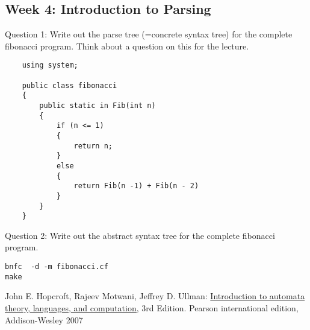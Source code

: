 \documentclass{article}
\theoremstyle{theorem}
\theoremstyle{definition}
\theoremstyle{remark}
\begin{document}
\subsection{Week 4: Introduction to Parsing}
Question 1: Write out the parse tree (=concrete syntax tree) for the complete fibonacci program. Think about a question on this for the lecture.
\begin{lstlisting}
	using system;
	
	public class fibonacci
	{
		public static in Fib(int n)
		{
			if (n <= 1)
			{
				return n;
			}
			else
			{
				return Fib(n -1) + Fib(n - 2)
			}
		}
	}
\end{lstlisting}
Question 2: Write out the abstract syntax tree for the complete fibonacci program. 
\begin{lstlisting}
bnfc  -d -m fibonacci.cf
make
\end{lstlisting}

\begin{thebibliography}{99}
	John E. Hopcroft, Rajeev Motwani, Jeffrey D. Ullman:
\href{http://ce.sharif.edu/courses/94-95/1/ce414-2/resources/root/Text%20Books/Automata/John%20E.%20Hopcroft,%20Rajeev%20Motwani,%20Jeffrey%20D.%20Ullman-Introduction%20to%20Automata%20Theory,%20Languages,%20and%20Computations-Prentice%20Hall%20(2006).pdf}{Introduction to automata theory, languages, and computation,} 3rd Edition. Pearson international edition, Addison-Wesley 2007

\end{thebibliography}
\end{document}
